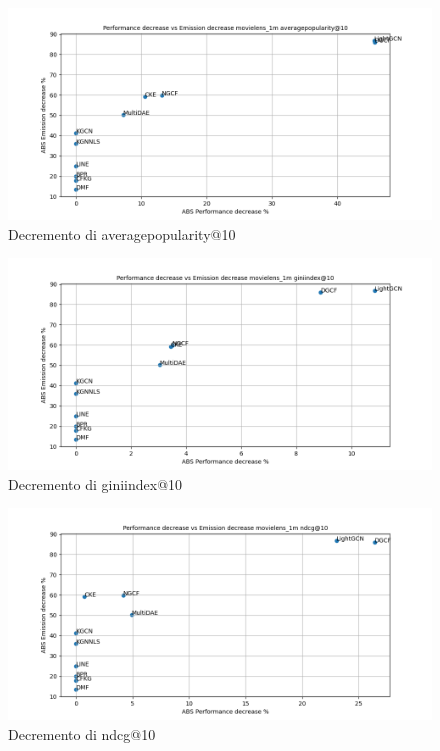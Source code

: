 \begin{figure}[H]
    \centering
    \includegraphics[scale=0.5]{images/decrement_averagepopularity@10_movielens_1m_30_7.png}
    \caption{Decremento di averagepopularity@10}
\end{figure}

\begin{figure}[H]
    \centering
    \includegraphics[scale=0.5]{images/decrement_giniindex@10_movielens_1m_30_7.png}
    \caption{Decremento di giniindex@10}
\end{figure}

\begin{figure}[H]
    \centering
    \includegraphics[scale=0.5]{images/decrement_ndcg@10_movielens_1m_30_7.png}
    \caption{Decremento di ndcg@10}
\end{figure}

